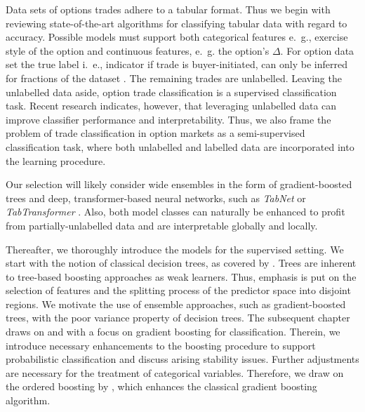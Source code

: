 Data sets of options trades adhere to a tabular format.  Thus we begin with reviewing state-of-the-art algorithms for classifying tabular data with regard to accuracy. Possible models must support both categorical features e.~g., exercise style of the option and continuous features, e.~g. the option's $\Delta$. For option data set the true label i.~e., indicator if trade is buyer-initiated, can only be inferred for fractions of the dataset \autocites{grauerOptionTradeClassification2022}{savickasInferringDirectionOption2003}. The remaining trades are unlabelled. Leaving the unlabelled data aside, option trade classification is a supervised classification task. Recent research \autocite{arikTabNetAttentiveInterpretable2020} indicates, however, that leveraging unlabelled data can improve classifier performance and interpretability. Thus, we also frame the problem of trade classification in option markets as a semi-supervised classification task, where both unlabelled and labelled data are incorporated into the learning procedure. 

Our selection will likely consider wide ensembles in the form of gradient-boosted trees and deep, transformer-based neural networks, such as \textit{TabNet} \autocite{arikTabNetAttentiveInterpretable2020} or \textit{TabTransformer} \autocite{huangTabTransformerTabularData2020}. Also, both model classes can naturally be enhanced to profit from partially-unlabelled data and are interpretable globally and locally. 

Thereafter, we thoroughly introduce the models for the supervised setting. We start with the notion of classical decision trees, as covered by \textcite{breimanClassificationRegressionTrees2017}. Trees are inherent to tree-based boosting approaches as weak learners. Thus, emphasis is put on the selection of features and the splitting process of the predictor space into disjoint regions. We motivate the use of ensemble approaches, such as gradient-boosted trees, with the poor variance property of decision trees. The subsequent chapter draws on \textcite{hastietrevorElementsStatisticalLearning2009} and \textcite{friedmanGreedyFunctionApproximation2001} with a focus on gradient boosting for classification. Therein, we introduce necessary enhancements to the boosting procedure to support probabilistic classification and discuss arising stability issues. Further adjustments are necessary for the treatment of categorical variables. Therefore, we draw on the ordered boosting by \autocite{prokhorenkovaCatBoostUnbiasedBoosting2018}, which enhances the classical gradient boosting algorithm.

